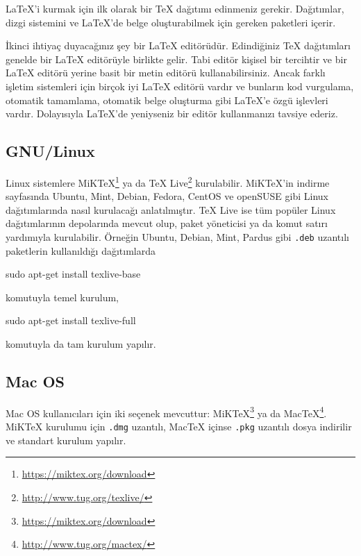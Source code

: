 \documentclass[
  10pt,
]{scrbook}
\newenvironment{Shaded}{\begin{snugshade}}{\end{snugshade}}
\newcommand{\FunctionTok}[1]{\textcolor[rgb]{0.00,0.00,0.00}{#1}}
\newcommand{\NormalTok}[1]{#1}
\renewcommand{\href}[2]{#2\footnote{\url{#1}}}
\theoremstyle{definition}
\theoremstyle{definition}
\theoremstyle{definition}
\theoremstyle{definition}
\theoremstyle{remark}
\begin{document}
LaTeX'i kurmak için ilk olarak bir TeX dağıtımı edinmeniz gerekir. Dağıtımlar, dizgi sistemini ve LaTeX'de belge oluşturabilmek için gereken paketleri içerir.

İkinci ihtiyaç duyacağınız şey bir LaTeX editörüdür. Edindiğiniz TeX dağıtımları genelde bir LaTeX editörüyle birlikte gelir. Tabi editör kişisel bir tercihtir ve bir LaTeX editörü yerine basit bir metin editörü kullanabilirsiniz. Ancak farklı işletim sistemleri için birçok iyi LaTeX editörü vardır ve bunların kod vurgulama, otomatik tamamlama, otomatik belge oluşturma gibi LaTeX'e özgü işlevleri vardır. Dolayısıyla LaTeX'de yeniyseniz bir editör kullanmanızı tavsiye ederiz.

\hypertarget{gnulinux}{%
\subsection{GNU/Linux}\label{gnulinux}}

Linux sistemlere \href{https://miktex.org/download}{MiKTeX} ya da \href{http://www.tug.org/texlive/}{TeX Live} kurulabilir. MiKTeX'in indirme sayfasında Ubuntu, Mint, Debian, Fedora, CentOS ve openSUSE gibi Linux dağıtımlarında nasıl kurulacağı anlatılmıştır. TeX Live ise tüm popüler Linux dağıtımlarının depolarında mevcut olup, paket yöneticisi ya da komut satırı yardımıyla kurulabilir. Örneğin Ubuntu, Debian, Mint, Pardus gibi \texttt{.deb} uzantılı paketlerin kullanıldığı dağıtımlarda

\begin{Shaded}
\begin{Highlighting}[]
\FunctionTok{sudo}\NormalTok{ apt{-}get install texlive{-}base}
\end{Highlighting}
\end{Shaded}

komutuyla temel kurulum,

\begin{Shaded}
\begin{Highlighting}[]
\FunctionTok{sudo}\NormalTok{ apt{-}get install texlive{-}full}
\end{Highlighting}
\end{Shaded}

komutuyla da tam kurulum yapılır.

\hypertarget{mac-os}{%
\subsection{Mac OS}\label{mac-os}}

Mac OS kullanıcıları için iki seçenek mevcuttur: \href{https://miktex.org/download}{MiKTeX} ya da \href{http://www.tug.org/mactex/}{MacTeX}. MiKTeX kurulumu için \texttt{.dmg} uzantılı, MacTeX içinse \texttt{.pkg} uzantılı dosya indirilir ve standart kurulum yapılır.
\end{document}
